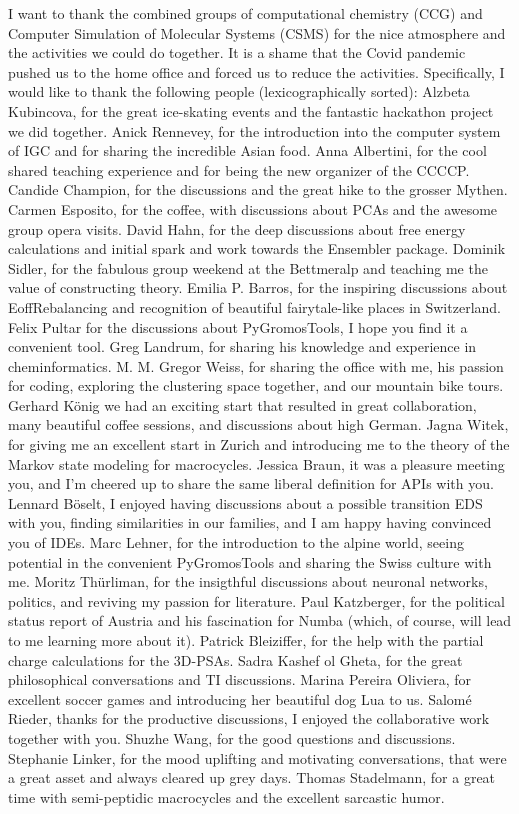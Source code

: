 I want to thank the combined groups of computational chemistry (CCG) and Computer Simulation of Molecular Systems (CSMS) for the nice atmosphere and the activities we could do together. It is a shame that the Covid pandemic pushed us to the home office and forced us to reduce the activities.
Specifically, I would like to thank the following people (lexicographically sorted):
Alzbeta Kubincova, for the great ice-skating events and the fantastic hackathon project we did together.
Anick Rennevey, for the introduction into the computer system of IGC and for sharing the incredible Asian food.
Anna Albertini, for the cool shared teaching experience and for being the new organizer of the CCCCP.
Candide Champion, for the discussions and the great hike to the grosser Mythen.
Carmen Esposito, for the coffee, with discussions about PCAs and the awesome group opera visits.
David Hahn, for the deep discussions about free energy calculations and initial spark and work towards the Ensembler package.
Dominik Sidler, for the fabulous group weekend at the Bettmeralp and teaching me the value of constructing theory.
Emilia P. Barros, for the inspiring discussions about EoffRebalancing and recognition of beautiful fairytale-like places in Switzerland.
Felix Pultar for the discussions about PyGromosTools, I hope you find it a convenient tool.
Greg Landrum, for sharing his knowledge and experience in cheminformatics.
M. M. Gregor Weiss, for sharing the office with me, his passion for coding, exploring the clustering space together, and our mountain bike tours.
Gerhard K{\"o}nig we had an exciting start that resulted in great collaboration, many beautiful coffee sessions, and discussions about high German.
Jagna Witek, for giving me an excellent start in Zurich and introducing me to the theory of the Markov state modeling for macrocycles.
Jessica Braun, it was a pleasure meeting you, and I'm  cheered up to share the same liberal definition for APIs with you.
Lennard B{\"o}selt, I enjoyed having discussions about a possible transition EDS with you, finding similarities in our families, and I am happy having convinced you of IDEs.
Marc Lehner, for the introduction to the alpine world, seeing potential in the convenient PyGromosTools and sharing the Swiss culture with me.
Moritz Th{\"u}rliman, for the insigthful discussions about neuronal networks, politics, and reviving my passion for literature.
Paul Katzberger, for the political status report of Austria and his fascination for Numba (which, of course, will lead to me learning more about it).
Patrick Bleiziffer, for the help with the partial charge calculations for the 3D-PSAs.
Sadra Kashef ol Gheta, for the great philosophical conversations and TI discussions.
Marina Pereira Oliviera, for excellent soccer games and introducing her beautiful dog Lua to us.
Salom{\'e} Rieder, thanks for the productive discussions, I enjoyed the collaborative work together with you.
Shuzhe Wang, for the good questions and discussions.
Stephanie Linker, for the mood uplifting and motivating conversations, that were a great asset and always cleared up grey days.
Thomas Stadelmann, for a great time with semi-peptidic macrocycles and the excellent sarcastic humor.



